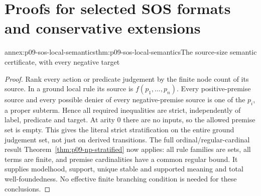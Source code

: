 \section{Proofs for selected SOS formats and conservative extensions}

\begin{annexitem}{annex:p09-sos-local-semantics}{thm:p09-sos-local-semantics}{The source-size semantic certificate, with every negative target}
\begin{proof}
Rank every action or predicate judgement by the finite node count
of its source. In a ground local rule its source is \(f(p_1,\ldots,p_n)\).
Every positive-premise source and every possible denier of every
negative-premise source is one of the \(p_i\), a proper subterm.
Hence all required inequalities are strict, independently of label,
predicate and target. At arity 0 there are no inputs, so the allowed
premise set is empty. This gives the literal strict stratification
on the entire ground judgement set, not just on derived transitions.
The full ordinal/regular-cardinal result
Theorem~\ref{thm:p09-np-stratified} now applies: all rule families
are sets, all terms are finite, and premise cardinalities have a
common regular bound. It supplies modelhood, support, unique
stable and supported meaning and total well-foundedness. No
effective finite branching condition is needed for these conclusions.
\end{proof}
\end{annexitem}

